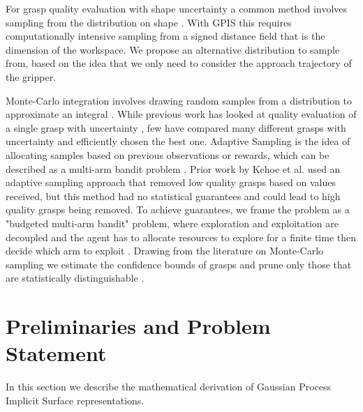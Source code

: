 \documentclass[letterpaper, 10 pt, conference]{ieeeconf}  %
\begin{document}
  For grasp quality evaluation with shape uncertainty a common method involves sampling from the distribution on shape \cite{kehoe2012estimating} \cite{kehoe2012toward} \cite{christopoulos2007handling}. With GPIS this requires computationally intensive sampling from a signed distance field that is the dimension of the workspace. We propose an alternative distribution to sample from, based on the idea that we only need to consider the approach trajectory of the gripper. 

Monte-Carlo integration involves drawing random samples from a distribution to approximate an integral \cite{caflisch1998monte}. While previous work has looked at quality evaluation of a single grasp with uncertainty \cite{christopoulos2007handling}\cite{zheng2005}, few have compared many different grasps with uncertainty and efficiently chosen the best one.  Adaptive Sampling is the idea of allocating samples based on previous observations or rewards, which can be described as a multi-arm bandit problem \cite{barto1998reinforcement}. Prior work by Kehoe et al. \cite{kehoe2012toward} used an adaptive sampling approach that removed low quality grasps based on values received, but this method had no statistical guarantees and could lead to high quality grasps being removed. To achieve guarantees, we frame the problem as a "budgeted multi-arm bandit" problem, where exploration and exploitation are decoupled and the agent has to allocate resources to explore for a finite time then decide which arm to exploit  \cite{madani2004budgeted}. Drawing from the literature on Monte-Carlo sampling we estimate the confidence bounds of grasps and prune only those that are statistically distinguishable \cite{caflisch1998monte}.  



\section{Preliminaries and Problem Statement}

In this section we describe the mathematical derivation of Gaussian Process Implicit Surface representations.
\end{document}
